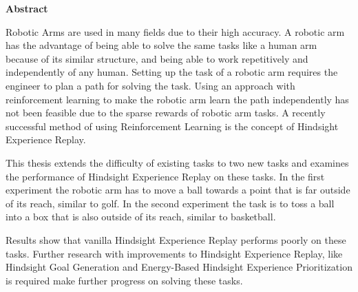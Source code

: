 

\clearemptydoublepage
{}
{}





\vspace*{2cm}
\begin{center}
{\Large \bf Abstract}
\end{center}
\vspace{1cm}


Robotic Arms are used in many fields due to their high accuracy. A robotic arm has the advantage of being able to solve the same tasks like a human arm because of its similar structure, and being able to work repetitively and independently of any human. Setting up the task of a robotic arm requires the engineer to plan a path for solving the task. Using an approach with reinforcement learning to make the robotic arm learn the path independently has not been feasible due to the sparse rewards of robotic arm tasks. A recently successful method of using Reinforcement Learning is the concept of Hindsight Experience Replay. 

\vspace{0.5cm}

This thesis extends the difficulty of existing tasks to two new tasks and examines the performance of Hindsight Experience Replay on these tasks. 
In the first experiment the robotic arm has to move a ball towards a point that is far outside of its reach, similar to golf.
In the second experiment the task is to toss a ball into a box that is also outside of its reach, similar to basketball.

\vspace{0.5cm}

Results show that vanilla Hindsight Experience Replay performs poorly on these tasks. Further research with improvements to Hindsight Experience Replay, like Hindsight Goal Generation and Energy-Based Hindsight Experience Prioritization is required make further progress on solving these tasks.


